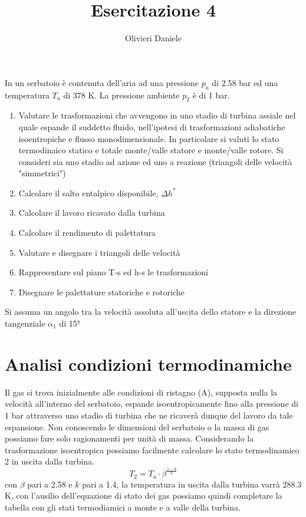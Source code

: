 \documentclass[a4paper,12pt]{article}
\title{Esercitazione 4}
\author{Olivieri Daniele}
\date{}
\begin{document}
\maketitle
In un serbatoio è contenuta dell'aria ad una pressione $p_a$ di 2.58 bar ed una temperatura $T_a$ di 378 K. La pressione ambiente $p_2$ è di 1 bar.
\begin{enumerate}
    \item Valutare le trasformazioni che avvengono in uno stadio di turbina assiale nel quale espande il suddetto fluido, nell'ipotesi
    di trasformazioni adiabatiche isoentropiche e flusso monodimensionale.
    In particolare si valuti lo stato termodinaico statico e totale monte/valle statore e monte/valle rotore. Si consideri sia uno stadio ad azione
    ed uno a reazione (triangoli delle velocità "simmetrici")    
    \item Calcolare il salto entalpico disponibile, $\Delta h^*$   
    \item Calcolare il lavoro ricavato dalla turbina
    \item Calcolare il rendimento di palettatura
    \item Valutare e disegnare i triangoli delle velocità
    \item Rappresentare sul piano T-s ed h-s le trasformazioni
    \item Disegnare le palettature statoriche e rotoriche
\end{enumerate}
Si assuma un angolo tra la velocità assoluta all'uscita dello statore e la direzione tangenziale $\alpha_1$ di 15°
\section{Analisi condizioni termodinamiche}
\label{sec:analisi_termodinamiche}
Il gas si trova inizialmente alle condizioni di ristagno (A), supposta nulla la velocità all'interno del serbatoio, espande isoentropicamente fino alla pressione di 1 bar
attraverso uno stadio di turbina che ne ricaverà dunque del lavoro da tale espansione. Non conoscendo le dimensioni del serbatoio o la massa di gas possiamo fare
solo ragionamenti per unità di massa.
Considerando la trasformazione isoentropica possiamo facilmente calcolare lo stato termodinamico 2 in uscita dalla turbina.
\begin{equation}
    T_2 = T_a\cdot\beta^{\frac{1-k}{k}}
\end{equation}
con $\beta$ pari a 2.58 e $k$ pari a 1.4, la temperatura in uscita dalla turbina varrà 288.3 K, con l'ausilio dell'equazione di stato dei gas
possiamo quindi completare la tabella con gli stati termodiamici a monte e a valle della turbina.
\end{document}
